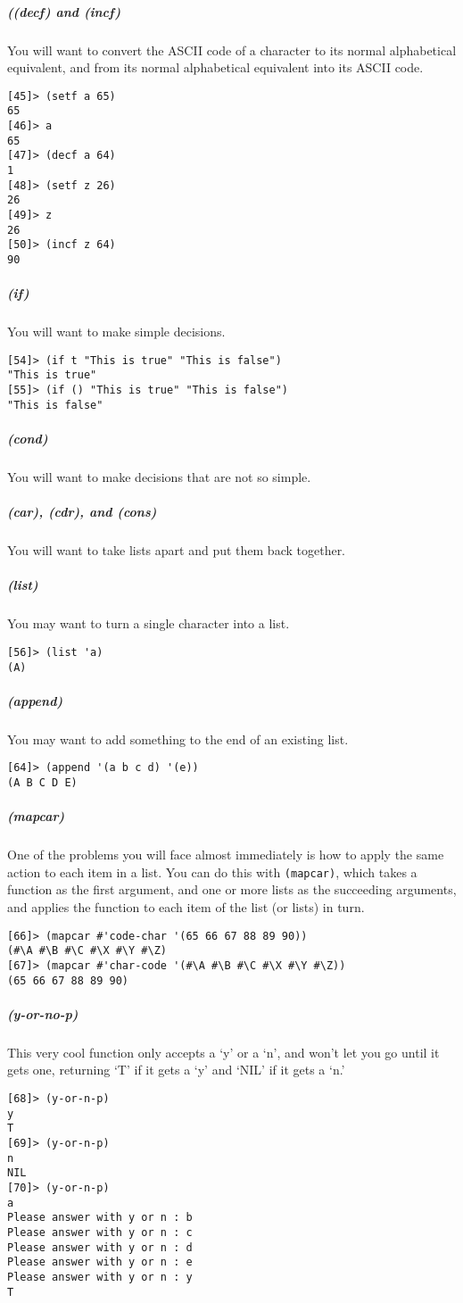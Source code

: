 \documentclass{article}
\begin{document}
\subparagraph{((decf) and (incf)}You will want to convert the ASCII code of a character to its normal alphabetical equivalent, and from its normal alphabetical equivalent into its ASCII code.
\begin{verbatim}
[45]> (setf a 65)
65
[46]> a
65
[47]> (decf a 64)
1
[48]> (setf z 26)
26
[49]> z
26
[50]> (incf z 64)
90
\end{verbatim}

\subparagraph{(if)}You will want to make simple decisions.
\begin{verbatim}
[54]> (if t "This is true" "This is false")
"This is true"
[55]> (if () "This is true" "This is false")
"This is false"
\end{verbatim}

\subparagraph{(cond)}You will want to make decisions that are not so simple. 

\subparagraph{(car), (cdr), and (cons)}You will want to take lists apart and put them back together.

\subparagraph{(list)}You may want to turn a single character into a list.
\begin{verbatim}
[56]> (list 'a)
(A)
\end{verbatim}

\subparagraph{(append)}You may want to add something to the end of an existing list.
\begin{verbatim}
[64]> (append '(a b c d) '(e))
(A B C D E)
\end{verbatim}

\subparagraph{(mapcar)}One of the problems you will face almost immediately is how to apply the same action to each item in a list. You can do this with \texttt{(mapcar)}, which takes a function as the first argument, and one or more lists as the succeeding arguments, and applies the function to each item of the list (or lists) in turn.
\begin{verbatim}
[66]> (mapcar #'code-char '(65 66 67 88 89 90))
(#\A #\B #\C #\X #\Y #\Z)
[67]> (mapcar #'char-code '(#\A #\B #\C #\X #\Y #\Z))
(65 66 67 88 89 90)
\end{verbatim}

\subparagraph{(y-or-no-p)}This very cool function only accepts a `y' or a `n', and won't let you go until it gets one, returning `T' if it gets a `y' and `NIL' if it gets a `n.'
\begin{verbatim}
[68]> (y-or-n-p)
y
T
[69]> (y-or-n-p)
n
NIL
[70]> (y-or-n-p)
a
Please answer with y or n : b
Please answer with y or n : c
Please answer with y or n : d
Please answer with y or n : e
Please answer with y or n : y
T
\end{verbatim}
\end{document}
